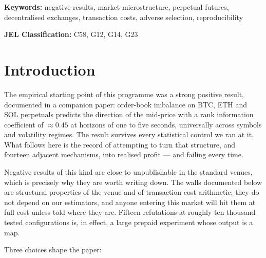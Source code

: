 \documentclass[11pt,a4paper]{article}
\begin{document}
\smallskip
\noindent\textbf{Keywords:} negative results, market microstructure,
perpetual futures, decentralised exchanges, transaction costs, adverse
selection, reproducibility

\smallskip
\noindent\textbf{JEL Classification:} C58, G12, G14, G23

\tableofcontents

\section{Introduction}
\label{sec:intro}

The empirical starting point of this programme was a strong positive
result, documented in a companion paper: order-book imbalance on BTC,
ETH and SOL perpetuals predicts the direction of the mid-price with a
rank information coefficient of ${\approx}0.45$ at horizons of one to
five seconds, universally across symbols and volatility regimes. The
result survives every statistical control we ran at it. What follows
here is the record of attempting to turn that structure, and fourteen
adjacent mechanisms, into realised profit --- and failing every time.

Negative results of this kind are close to unpublishable in the
standard venues, which is precisely why they are worth writing down.
The walls documented below are structural properties of the venue and
of transaction-cost arithmetic; they do not depend on our estimators,
and anyone entering this market will hit them at full cost unless told
where they are. Fifteen refutations at roughly ten thousand tested
configurations is, in effect, a large prepaid experiment whose output
is a map.

Three choices shape the paper:
\end{document}
